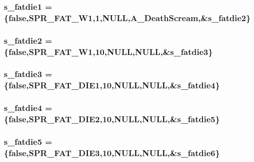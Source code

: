 \label{WL__ACT2_8C_ae2e05461bc31bea7fb647a6710ba6924}
\hypertarget{WL__ACT2_8C_a737bb7a90f84a719bdf398a39968ffed}{
\subsubsection[{s\_\-fatdie1}]{ {\bf s\_\-fatdie1} = \{false,SPR\_\-FAT\_\-W1,1,NULL,A\_\-DeathScream,\&{\bf s\_\-fatdie2}\}}}
\label{WL__ACT2_8C_a737bb7a90f84a719bdf398a39968ffed}
\hypertarget{WL__ACT2_8C_a3607e917f6f5fae70a66ec35fe5be9d6}{
\subsubsection[{s\_\-fatdie2}]{ {\bf s\_\-fatdie2} = \{false,SPR\_\-FAT\_\-W1,10,NULL,NULL,\&{\bf s\_\-fatdie3}\}}}
\label{WL__ACT2_8C_a3607e917f6f5fae70a66ec35fe5be9d6}
\hypertarget{WL__ACT2_8C_a8b76b73a19a81e94ab63d2cfcc7291a8}{
\subsubsection[{s\_\-fatdie3}]{ {\bf s\_\-fatdie3} = \{false,SPR\_\-FAT\_\-DIE1,10,NULL,NULL,\&{\bf s\_\-fatdie4}\}}}
\label{WL__ACT2_8C_a8b76b73a19a81e94ab63d2cfcc7291a8}
\hypertarget{WL__ACT2_8C_a6502b1d08c4be84b39ba6b3dbd18fa9f}{
\subsubsection[{s\_\-fatdie4}]{ {\bf s\_\-fatdie4} = \{false,SPR\_\-FAT\_\-DIE2,10,NULL,NULL,\&{\bf s\_\-fatdie5}\}}}
\label{WL__ACT2_8C_a6502b1d08c4be84b39ba6b3dbd18fa9f}
\hypertarget{WL__ACT2_8C_a2c89a533900581cc30bfb519c4ec5a96}{
\subsubsection[{s\_\-fatdie5}]{ {\bf s\_\-fatdie5} = \{false,SPR\_\-FAT\_\-DIE3,10,NULL,NULL,\&{\bf s\_\-fatdie6}\}}}
